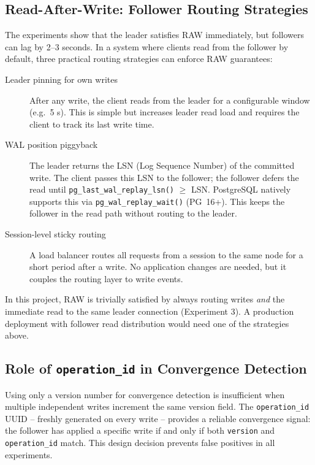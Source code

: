 \documentclass[12pt,a4paper]{article}
\begin{document}
\subsection{Read-After-Write: Follower Routing Strategies}
\label{sec:raw-routing}

The experiments show that the leader satisfies RAW immediately, but followers
can lag by 2--3 seconds. In a system where clients read from the follower by
default, three practical routing strategies can enforce RAW guarantees:

\begin{description}
    \item[Leader pinning for own writes] After any write, the client reads from
        the leader for a configurable window (e.g.\ 5 s). This is simple but
        increases leader read load and requires the client to track its last write
        time.
    \item[WAL position piggyback] The leader returns the LSN (Log Sequence Number)
        of the committed write. The client passes this LSN to the follower; the
        follower defers the read until \texttt{pg\_last\_wal\_replay\_lsn()} $\geq$
        LSN. PostgreSQL natively supports this via \texttt{pg\_wal\_replay\_wait()}
        (PG~16+). This keeps the follower in the read path without routing to
        the leader.
    \item[Session-level sticky routing] A load balancer routes all requests from
        a session to the same node for a short period after a write. No application
        changes are needed, but it couples the routing layer to write events.
\end{description}

In this project, RAW is trivially satisfied by always routing writes \textit{and}
the immediate read to the same leader connection (Experiment 3). A production
deployment with follower read distribution would need one of the strategies above.

\subsection{Role of \texttt{operation\_id} in Convergence Detection}

Using only a version number for convergence detection is insufficient when
multiple independent writes increment the same version field. The \texttt{operation\_id}
UUID -- freshly generated on every write -- provides a reliable convergence
signal: the follower has applied a specific write if and only if both
\texttt{version} and \texttt{operation\_id} match. This design decision prevents
false positives in all experiments.
\end{document}
